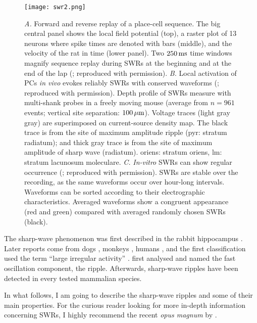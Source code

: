     \begin{figure}
      \center
      \texttt{[image: swr2.png]}
      \caption{
        {\it A.} Forward and reverse replay of a place-cell sequence. The big central
        panel shows the local field potential (top), a raster plot of 13
        neurons where spike times are denoted with bars (middle), and the
        velocity of the rat in time (lower panel). Two $250\, \rm ms$ time windows magnify sequence
        replay during SWRs at the beginning and at the end of the
        lap (\citealp{Diba2007}; reproduced with permission).
        {\it B.} Local activation of PCs \textit{in vivo} evokes reliably SWRs
        with conserved waveforms (\citealp{Stark2014}; reproduced with
        permission). Depth profile of SWRs measure with multi-shank probes in a
        freely moving mouse (average from $n = 961$ events; vertical site
        separation: $100\,\rm \mu m$). Voltage traces (light gray gray) are
        superimposed on current-source density map. The black trace is from the
        site of maximum amplitude ripple (pyr: stratum radiatum); and thick
        gray trace is from the site of maximum amplitude of sharp wave (radiatum).
        oriens: stratum oriens, lm: stratum lacunosum moleculare.
        {\it C.} \textit{In-vitro} SWRs can show regular occurrence
        (\citealp{Reichinnek2010}; reproduced with permission). SWRs are
        stable over the recording, as the same waveforms occur over hour-long
        intervals. Waveforms can be sorted according to their electrographic
        characteristics. Averaged waveforms show a congruent
        appearance (red and green) compared with averaged randomly chosen SWRs (black).
             }
    \label{fig:swr}
    \end{figure}

  The sharp-wave phenomenon was first described in the rabbit hippocampus
  \citep{Stumpf1965}. Later reports come from dogs \citep{Yoshii1966}, monkeys
  \citep{Freemon1969}, humans \citep{Freemon1970}, and the first classification
  used the term ``large irregular activity'' \citep{Vanderwolf1969}.
  \cite{Buzsaki1992} first analysed and named the fast oscillation component,
  the ripple. Afterwards, sharp-wave ripples have been detected in every tested
  mammalian species. 

  In what follows, I am going to describe the sharp-wave ripples and some of
  their main properties. For the curious reader looking for more in-depth
  information concerning SWRs, I highly recommend the recent \textit{opus
  magnum} by \cite{Buzsaki2015}.

